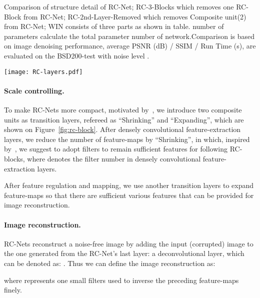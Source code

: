 \documentclass[10pt,twocolumn,letterpaper]{article}
\begin{document}
\begin{table*}[h]
\label{fig:rc-layer}
  \centering
  \caption{\small Comparison of structure detail of RC-Net;  RC-3-Blocks which removes one RC-Block from RC-Net;  RC-2nd-Layer-Removed which removes  Composite unit(2) from RC-Net;  WIN consists of three parts as shown in table. number of parameters calculate the total parameter number of network.Comparison is based on image denoising  performance, average PSNR (dB) / SSIM / Run Time (s), are evaluated on the BSD200-test with noise level .}
  \texttt{[image: RC-layers.pdf]}
  
\end{table*} 


\paragraph{Scale controlling.}
To make RC-Nets more compact, motivated by~\cite{dong2016accelerating}, we introduce two  composite units as transition layers, refereed as ``Shrinking'' and ``Expanding'', which are shown on Figure~\ref{fig:rc-block}. After densely convolutional feature-extraction layers, we reduce the number of feature-maps by ``Shrinking'', in which, inspired by~\cite{lu2017expressive}, we suggest to adopt  filters to remain sufficient features for following RC-blocks, where  denotes the filter number in densely convolutional feature-extraction layers. 

After feature regulation and mapping, we use another transition layers to expand feature-maps so that there are sufficient various features that can be provided for image reconstruction.  


\paragraph{Image reconstruction.}
RC-Nets reconstruct a noise-free image  by adding the input (corrupted) image  to the one generated from the RC-Net's last layer: a deconvolutional layer, which can be denoted as: . Thus we can define the image reconstruction as: 
 

where  represents one small filters used to inverse the preceding feature-maps finely. 








 
\end{document}
